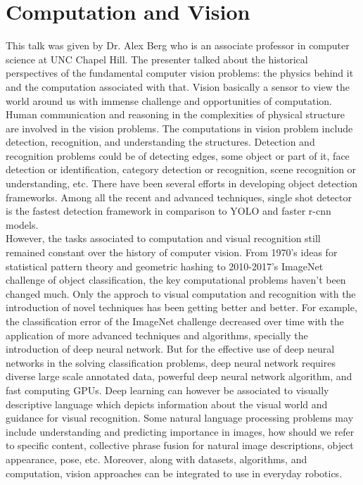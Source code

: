 \documentclass{report}
\begin{document}
\newpage

\section{Computation and Vision}
This talk was given by Dr. Alex Berg who is an associate professor in computer science at UNC Chapel Hill. The presenter talked about the historical perspectives of the fundamental computer vision problems: the physics behind it and the computation associated with that. Vision basically a sensor to view the world around us with immense challenge and opportunities of computation. Human communication and reasoning in the complexities of physical structure are involved in the vision problems. The computations in vision problem include detection, recognition, and understanding the structures. Detection and recognition problems could be of detecting edges, some object or part of it, face detection or identification, category detection or recognition, scene recognition or understanding, etc. There have been several efforts in developing object detection frameworks. Among all the recent and advanced techniques, single shot detector is the fastest detection framework in comparison to YOLO and faster r-cnn models. \\  

However, the tasks associated to computation and visual recognition still remained constant over the history of computer vision. From 1970's ideas for statistical pattern theory and geometric hashing to 2010-2017's ImageNet challenge of object classification, the key computational problems haven't been changed much. Only the approch to visual computation and recognition with the introduction of novel techniques has been getting better and better. For example, the classification error of the ImageNet challenge decreased over time with the application of more advanced techniques and algorithms, specially the introduction of deep neural network. But for the effective use of deep neural networks in the solving classification problems, deep neural network requires diverse large scale annotated data, powerful deep neural network algorithm, and fast computing GPUs. Deep learning can however be associated to visually descriptive language which depicts information about the visual world and guidance for visual recognition. Some natural language processing problems may  include understanding and predicting importance in images, how should we refer to specific content, collective phrase fusion for natural image descriptions, object appearance, pose, etc. Moreover, along with datasets, algorithms, and computation, vision approaches can be integrated to use in everyday robotics.      
\end{document}
